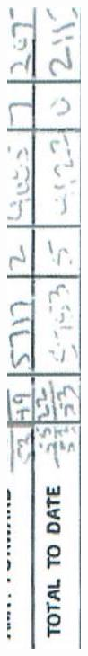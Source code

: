 \documentclass[10pt]{article}
\begin{document}
\includegraphics[max width=\textwidth, center]{2025_02_27_dd68c3d38de88f0516d9g-019(3)}\\
\end{document}
